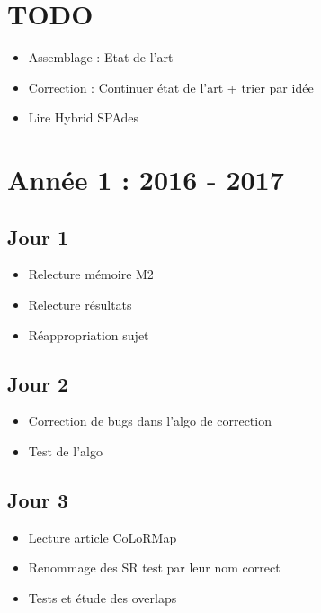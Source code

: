\documentclass[12pt]{report}
\begin{document}
\chapter{TODO}

\begin{itemize}
	\item Assemblage : Etat de l'art
	\item Correction : Continuer état de l'art + trier par idée
	\item Lire Hybrid SPAdes
\end{itemize}

\chapter{Année 1 : 2016 - 2017}

\section{Jour 1}

\begin{itemize}
  \item Relecture mémoire M2

  \item Relecture résultats

  \item Réappropriation sujet
\end{itemize}

\section{Jour 2}

\begin{itemize}
  \item Correction de bugs dans l'algo de correction

  \item Test de l'algo
\end{itemize}

\section{Jour 3}

\begin{itemize}
  \item Lecture article CoLoRMap

  \item Renommage des SR test par leur nom correct

  \item Tests et étude des overlaps
\end{itemize}
\end{document}
